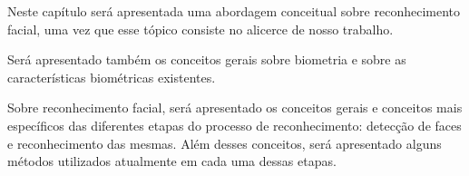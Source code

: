 	Neste capítulo será apresentada uma abordagem conceitual sobre reconhecimento facial, uma vez que esse tópico consiste no alicerce de nosso trabalho. 

	Será apresentado também os conceitos gerais sobre biometria e sobre as características biométricas existentes.

	Sobre reconhecimento facial, será apresentado os conceitos gerais e conceitos mais específicos das diferentes etapas do processo de reconhecimento: detecção de faces e reconhecimento das mesmas. Além desses conceitos, será apresentado alguns métodos utilizados atualmente em cada uma dessas etapas.


	
	






























